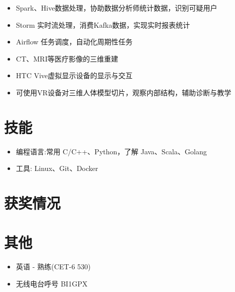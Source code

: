 \documentclass{resume}
\begin{document}
\begin{itemize}[topsep = 0 pt, partopsep = 0pt]
  \item Spark、Hive数据处理，协助数据分析师统计数据，识别可疑用户
  \item Storm 实时流处理，消费Kafka数据，实现实时报表统计
  \item Airflow 任务调度，自动化周期性任务
\end{itemize}

\begin{itemize}[topsep = 0 pt, partopsep = 0pt]
  \item CT、MRI等医疗影像的三维重建
  \item HTC Vive虚拟显示设备的显示与交互
  \item 可使用VR设备对三维人体模型切片，观察内部结构，辅助诊断与教学
\end{itemize}

\section{ 技能}
\begin{itemize}[parsep=0.5ex]
  \item 编程语言:常用 C/C++、Python，了解 Java、Scala、Golang
  \item 工具: Linux、Git、Docker
\end{itemize}

\section{ 获奖情况}

\section{ 其他}
\begin{itemize}[parsep=0.5ex]
  \item  英语 - 熟练(CET-6 530)
  \item  无线电台呼号 BI1GPX
\end{itemize}
\end{document}
